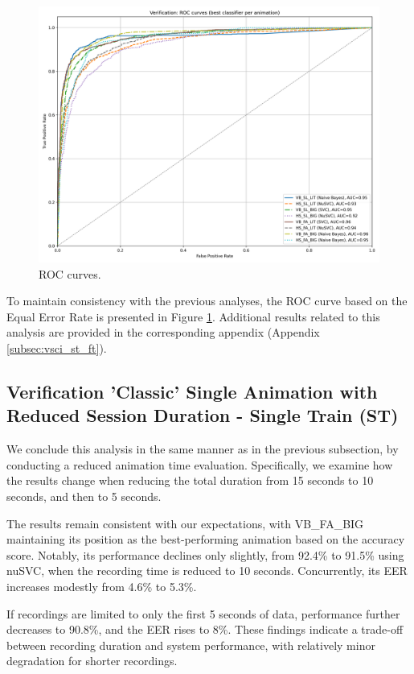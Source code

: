 \documentclass[12pt]{report}
\begin{document}
\begin{figure}[ht]
    \centering
    \includegraphics[width = 0.6
    \textwidth]{Images/Results/Classic_procedure/Verification_intruders/st/Verification_single_intruders_roc_two_st.png}
    \caption{ROC curves.}
    \label{fig:roc_cist}
\end{figure}

To maintain consistency with the previous analyses, the ROC curve based on the Equal Error Rate is presented in Figure \ref{fig:roc_cist}. 
Additional results related to this analysis are provided in the corresponding appendix (Appendix \ref{subsec:vsci_st_ft}).
\FloatBarrier

\subsection{Verification 'Classic' Single Animation with Reduced Session Duration - Single Train (ST)}

We conclude this analysis in the same manner as in the previous subsection, by conducting a reduced animation time evaluation. 
Specifically, we examine how the results change when reducing the total duration from 15 seconds to 10 seconds, and then to 5 seconds.

The results remain consistent with our expectations, with VB\_FA\_BIG maintaining its position as the best-performing animation based on the accuracy score. 
Notably, its performance declines only slightly, from 92.4\% to 91.5\% using nuSVC, when the recording time is reduced to 10 seconds. 
Concurrently, its EER increases modestly from 4.6\% to 5.3\%.

If recordings are limited to only the first 5 seconds of data, performance further decreases to 90.8\%, and the EER rises to 8\%. 
These findings indicate a trade-off between recording duration and system performance, with relatively minor degradation for shorter recordings.
\end{document}
